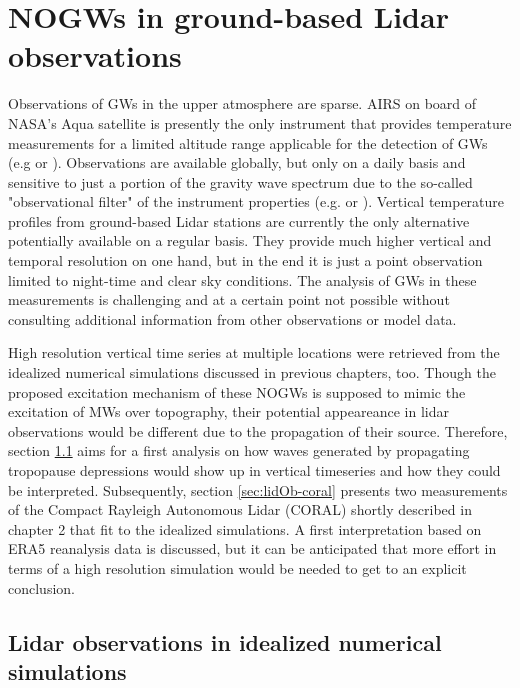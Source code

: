\chapter{NOGWs in ground-based Lidar observations}

Observations of GWs in the upper atmosphere are sparse. AIRS on board of NASA’s Aqua satellite is presently the only instrument that provides temperature measurements for a limited altitude range applicable for the detection of GWs (e.g \cite[]{hindley_gravity_2019} or \cite[]{hindley_18year_2020}). Observations are available globally, but only on a daily basis and sensitive to just a portion of the gravity wave spectrum due to the so-called "observational filter" of the instrument properties (e.g. \cite[]{preusse_space-based_2002} or \cite[]{alexander_recent_2010}). Vertical temperature profiles from ground-based Lidar stations are currently the only alternative potentially available on a regular basis. They provide much higher vertical and temporal resolution on one hand, but in the end it is just a point observation limited to night-time and clear sky conditions. The analysis of GWs in these measurements is challenging and at a certain point not possible without consulting additional information from other observations or model data. 

High resolution vertical time series at multiple locations were retrieved from the idealized numerical simulations discussed in previous chapters, too. Though the proposed excitation mechanism of these NOGWs is supposed to mimic the excitation of MWs over topography, their potential appeareance in lidar observations would be different due to the propagation of their source. Therefore, section \ref{sec:lidOb-idealized} aims for a first analysis on how waves generated by propagating tropopause depressions would show up in vertical timeseries and how they could be interpreted. Subsequently, section \ref{sec:lidOb-coral} presents two measurements of the Compact Rayleigh Autonomous Lidar (CORAL) shortly described in chapter 2 that fit to the idealized simulations. A first interpretation based on ERA5 reanalysis data is discussed, but it can be anticipated that more effort in terms of a high resolution simulation would be needed to get to an explicit conclusion. 

\section{Lidar observations in idealized numerical simulations}
\label{sec:lidOb-idealized}


